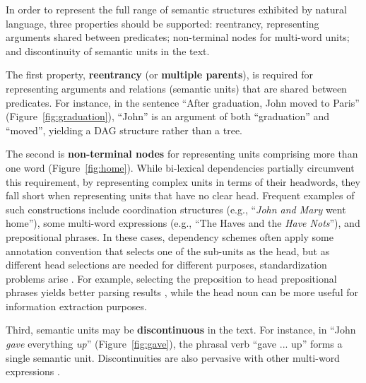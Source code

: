 \documentclass[12pt,a4paper]{report}
\begin{document}
In order to represent the full range of semantic structures exhibited by
natural language, three properties should be supported: reentrancy,
representing arguments shared between predicates;
non-terminal nodes for multi-word units;
and discontinuity of semantic units in the text.

The first property, \textbf{reentrancy} (or \textbf{multiple parents}), is required for
representing arguments and relations (semantic units) that are shared between predicates.
For instance, in the sentence
``After graduation, John moved to Paris'' (Figure~\ref{fig:graduation}),
``John'' is an argument of both ``graduation''
and ``moved'', yielding a DAG structure rather than a tree.

The second is \textbf{non-terminal nodes} for representing units
comprising more than one word (Figure~\ref{fig:home}).
While bi-lexical dependencies partially circumvent this requirement, by
representing complex units in terms of their headwords, they fall short
when representing units that have no clear head.
Frequent examples of such constructions include
coordination structures (e.g., ``\textit{John and Mary} went home''),
some multi-word expressions (e.g., ``The Haves and the \textit{Have Nots}''),
and prepositional phrases.
In these cases, dependency schemes often apply some annotation convention that
selects one of the sub-units
as the head, but as different head selections are needed for different purposes,
standardization problems arise \cite{Ivanova2012who}.
For example, selecting the preposition to head prepositional phrases yields better
parsing results \cite{Schwartz:12}, while the head noun can be more useful for
information extraction purposes.

Third, semantic units may be \textbf{discontinuous} in the text. For instance, in
``John \textit{gave} everything \textit{up}'' (Figure~\ref{fig:gave}),
the phrasal verb ``gave ... up'' forms a single semantic unit.
Discontinuities are also pervasive with other multi-word
expressions \cite{schneider2014discriminative}.
\end{document}
